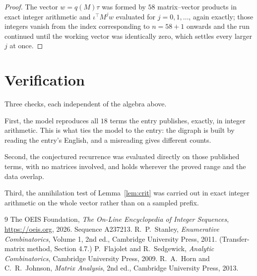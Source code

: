 \documentclass[11pt,a4paper]{article}
\theoremstyle{plain}
\theoremstyle{definition}
\begin{document}
\begin{proof}
The vector $w=q(M)\tau$ was formed by $58$ matrix--vector products in exact integer
arithmetic and $\iota^{\!\top}M^{j}w$ evaluated for $j=0,1,\dots$, again exactly; those
integers vanish from the index corresponding to $n=58+1$ onwards and the run continued
until the working vector was identically zero, which settles every larger $j$ at once.
\end{proof}

\section{Verification}

Three checks, each independent of the algebra above.

First, the model reproduces all $18$ terms the entry publishes, exactly, in integer
arithmetic. This is what ties the model to the entry: the digraph is built by reading the
entry's English, and a misreading gives different counts.

Second, the conjectured recurrence was evaluated directly on those published terms, with no
matrices involved, and holds wherever the proved range and the data overlap.

Third, the annihilation test of Lemma~\ref{lem:crit} was carried out in exact integer
arithmetic on the whole vector rather than on a sampled prefix.

\begin{thebibliography}{9}
 The OEIS Foundation, \emph{The On-Line Encyclopedia of Integer
Sequences}, \url{https://oeis.org}, 2026. Sequence A237213.
 R.~P.~Stanley, \emph{Enumerative Combinatorics}, Volume 1, 2nd ed.,
Cambridge University Press, 2011. (Transfer-matrix method, Section 4.7.)
 P.~Flajolet and R.~Sedgewick, \emph{Analytic Combinatorics}, Cambridge
University Press, 2009.
 R.~A.~Horn and C.~R.~Johnson, \emph{Matrix Analysis}, 2nd ed., Cambridge
University Press, 2013.
\end{thebibliography}
\end{document}
